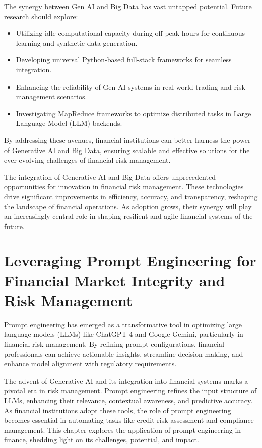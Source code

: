 \documentclass[a4paper,headinclude=on,footinclude=on,12pt,oneside]{scrbook}
\begin{document}
	The synergy between Gen AI and Big Data has vast untapped potential. Future research should explore:
	\begin{itemize}
		\item Utilizing idle computational capacity during off-peak hours for continuous learning and synthetic data generation.
		\item Developing universal Python-based full-stack frameworks for seamless integration.
		\item Enhancing the reliability of Gen AI systems in real-world trading and risk management scenarios.
		\item Investigating MapReduce frameworks to optimize distributed tasks in Large Language Model (LLM) backends.
	\end{itemize}
	
	By addressing these avenues, financial institutions can better harness the power of Generative AI and Big Data, ensuring scalable and effective solutions for the ever-evolving challenges of financial risk management.
	
	The integration of Generative AI and Big Data offers unprecedented opportunities for innovation in financial risk management. These technologies drive significant improvements in efficiency, accuracy, and transparency, reshaping the landscape of financial operations. As adoption grows, their synergy will play an increasingly central role in shaping resilient and agile financial systems of the future.
	
	\chapter{Leveraging Prompt Engineering for Financial Market Integrity and Risk Management}
	
	Prompt engineering has emerged as a transformative tool in optimizing large language models (LLMs) like ChatGPT-4 and Google Gemini, particularly in financial risk management. By refining prompt configurations, financial professionals can achieve actionable insights, streamline decision-making, and enhance model alignment with regulatory requirements.
	
	The advent of Generative AI and its integration into financial systems marks a pivotal era in risk management. Prompt engineering refines the input structure of LLMs, enhancing their relevance, contextual awareness, and predictive accuracy. As financial institutions adopt these tools, the role of prompt engineering becomes essential in automating tasks like credit risk assessment and compliance management. This chapter explores the application of prompt engineering in finance, shedding light on its challenges, potential, and impact.
	
\end{document}
